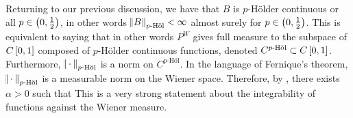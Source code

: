 \documentclass[../main.tex]{subfiles}
\begin{document}
Returning to our previous discussion, we have that $B$ is $p$-H\"older continuous or all $p\in\intoo{0,\frac12}$, in other words $\norm{B}_{p\text{-H\"ol}}<\infty$ almost surely for $p\in\intoo{0,\frac12}$. This is equivalent to saying that  in other words $P^W$ gives full measure to the subspace of $C\intcc{0,1}$ composed of $p$-H\"older continuous functions, denoted $C^{p\text{-H\"ol}}\subset C\intcc{0,1}$. Furthermore, $\norm{\,\cdot\,}_{p\text{-H\"ol}}$ is a norm on $C^{p\text{-H\"ol}}$. In the language of Fernique's theorem, $\norm{\,\cdot\,}_{p\text{-H\"ol}}$ is a measurable norm on the Wiener space. Therefore, by , there exists $\alpha>0$ such that  This is a very strong statement about the integrability of functions against the Wiener measure.
\end{document}
